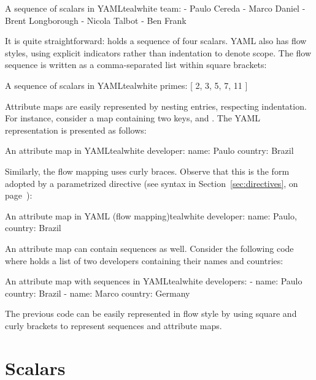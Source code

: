 \begin{codebox}{A sequence of scalars in YAML}{teal}{\icnote}{white}
team:
- Paulo Cereda
- Marco Daniel
- Brent Longborough
- Nicola Talbot
- Ben Frank
\end{codebox}

It is quite straightforward:  holds a sequence of four scalars. \gls{YAML} also has flow styles, using explicit indicators rather than indentation to denote scope. The flow sequence is written as a comma-separated list within square brackets:

\begin{codebox}{A sequence of scalars in YAML}{teal}{\icnote}{white}
primes: [ 2, 3, 5, 7, 11 ]
\end{codebox}

Attribute maps are easily represented by nesting entries, respecting indentation. For instance, consider a map  containing two keys,  and . The \gls{YAML} representation is presented as follows:

\begin{codebox}{An attribute map in YAML}{teal}{\icnote}{white}
developer:
 name: Paulo
 country: Brazil
\end{codebox}

Similarly, the flow mapping uses curly braces. Observe that this is the form adopted by a parametrized directive (see syntax in Section~\ref{sec:directives}, on page~\pageref{sec:directives}):

\begin{codebox}{An attribute map in YAML (flow mapping)}{teal}{\icnote}{white}
developer: { name: Paulo, country: Brazil }
\end{codebox}

An attribute map can contain sequences as well. Consider the following code where  holds a list of two developers containing their names and countries:

\begin{codebox}{An attribute map with sequences in YAML}{teal}{\icnote}{white}
developers:
- name: Paulo
  country: Brazil
- name: Marco
  country: Germany
\end{codebox}

The previous code can be easily represented in flow style by using square and curly brackets to represent sequences and attribute maps.

\section{Scalars}
\label{sec:yamlscalars}

